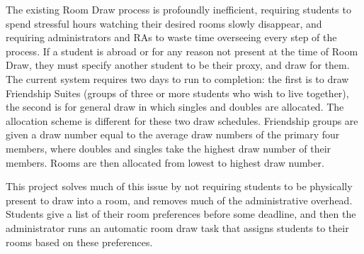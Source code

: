 The existing Room Draw process is profoundly inefficient, requiring students to spend stressful hours
watching their desired rooms slowly disappear, and requiring administrators and RAs to waste time
overseeing every step of the process.  If a student is abroad or for any reason not present at
the time of Room Draw, they must specify another student to be their proxy, and draw for them.
The current system requires two days to run to completion: the first is to draw Friendship Suites 
(groups of three or more students who wish to live together), the second is for general draw in 
which singles and doubles are allocated.  The allocation scheme is different for these two draw 
schedules. Friendship groups are given a draw number equal to the average draw numbers 
of the primary four members, where doubles and singles take the highest draw number 
of their members. Rooms are then allocated from lowest to highest draw number.

This project solves much of this issue by not requiring students to be physically
present to draw into a room, and removes much of the administrative overhead.
Students give a list of their room preferences before some deadline, and then
the administrator runs an automatic room draw task that assigns students to
their rooms based on these preferences. 
